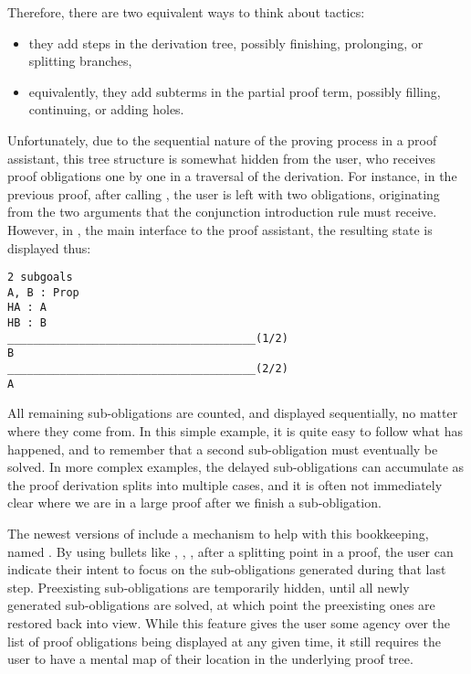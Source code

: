 Therefore, there are two equivalent ways to think about tactics:

\begin{itemize}

  \item they add steps in the derivation tree, possibly finishing, prolonging,
or splitting branches,

  \item equivalently, they add subterms in the partial proof term, possibly
filling, continuing, or adding holes.

\end{itemize}

Unfortunately, due to the sequential nature of the proving process in a proof
assistant, this tree structure is somewhat hidden from the user, who receives
proof obligations one by one in a traversal of the derivation.  For instance, in
the previous proof, after calling , the user is left with two
obligations, originating from the two arguments that the conjunction
introduction rule must receive.  However, in \CoqIDE{}, the main interface to
the proof assistant, the resulting state is displayed thus:

\begin{verbatim}
2 subgoals
A, B : Prop
HA : A
HB : B
______________________________________(1/2)
B
______________________________________(2/2)
A
\end{verbatim}

All remaining sub-obligations are counted, and displayed sequentially, no matter
where they come from.  In this simple example, it is quite easy to follow what
has happened, and to remember that a second sub-obligation must eventually be
solved.  In more complex examples, the delayed sub-obligations can accumulate as
the proof derivation splits into multiple cases, and it is often not immediately
clear where we are in a large proof after we finish a sub-obligation.

The newest versions of \Coq{} include a mechanism to help with this bookkeeping,
named .  By using bullets like \coqinline{+}, \coqinline{-},
\coqinline{*}, after a splitting point in a proof, the user can indicate their
intent to focus on the sub-obligations generated during that last step.
Preexisting sub-obligations are temporarily hidden, until all newly generated
sub-obligations are solved, at which point the preexisting ones are restored
back into view.  While this feature gives the user some agency over the list of
proof obligations being displayed at any given time, it still requires the user
to have a mental map of their location in the underlying proof tree.

